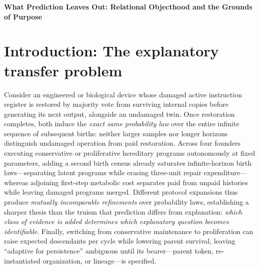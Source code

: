 \documentclass[11pt,letterpaper]{article}
\begin{document}
\thispagestyle{plain}
\begin{center}
{\fontsize{17.5}{22}\selectfont\bfseries What Prediction Leaves Out:
Relational Objecthood and the Grounds of Purpose\par}
\end{center}
\vspace{4pt}
\begin{abstract}
\noindent When does predictive adequacy warrant ontological claims about
persistence or teleological claims about purpose? For four founders
executing hereditary programs autonomously at fixed parameters in a
stochastic repair-and-reproduction model, undamaged and repaired
conservative founders share the exact infinite-horizon birth law while
paying zero versus three repair units. Two birth censuses saturate
infinite-horizon birth laws, separating latent programs while erasing
repair cost; adjoining initial cost separates repair histories while
merging damaged programs, yielding incomparable law refinements (though
single runs overlap). Proliferation can maximize lineage growth while
lowering parent survival, motivating calibrated relational objecthood
and bearer-indexed purpose.
\end{abstract}
\vspace{8pt}

\section{Introduction: The explanatory transfer
problem}\label{introduction-the-explanatory-transfer-problem}

Consider an engineered or biological device whose damaged active
instruction register is restored by majority vote from surviving
internal copies before generating its next output, alongside an
undamaged twin. Once restoration completes, both induce the \emph{exact
same probability law} over the entire infinite sequence of subsequent
births: neither larger samples nor longer horizons distinguish undamaged
operation from paid restoration. Across four founders executing
conservative or proliferative hereditary programs autonomously at fixed
parameters, adding a second birth census already saturates
infinite-horizon birth laws---separating latent programs while erasing
three-unit repair expenditure---whereas adjoining first-step metabolic
cost separates paid from unpaid histories while leaving damaged programs
merged. Different protocol expansions thus produce \emph{mutually
incomparable refinements} over probability laws, establishing a sharper
thesis than the truism that prediction differs from explanation:
\emph{which class of evidence is added determines which explanatory
question becomes identifiable}. Finally, switching from conservative
maintenance to proliferation can raise expected descendants per cycle
while lowering parent survival, leaving ``adaptive for persistence''
ambiguous until its bearer---parent token, re-instantiated organization,
or lineage---is specified.
\end{document}
